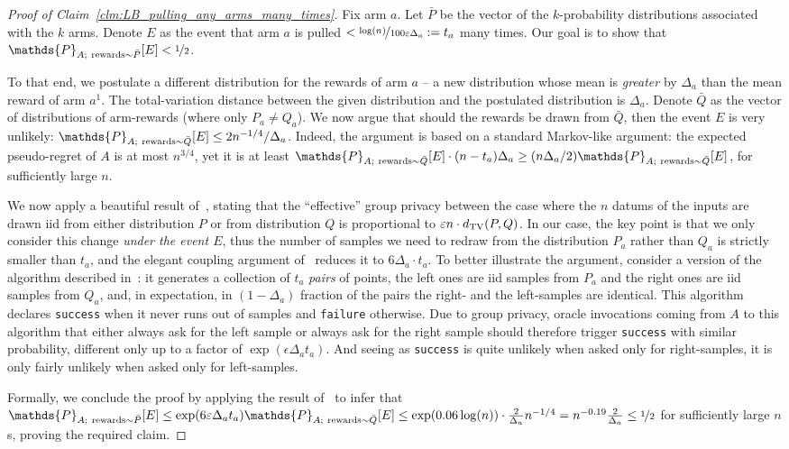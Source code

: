 \documentclass{article}
\renewcommand{\Pr}{\mathds{P}}
\begin{document}
\begin{proof}[Proof of Claim~\ref{clm:LB_pulling_any_arms_many_times}]
Fix arm $a$. Let $\bar P$ be the vector of the $k$-probability distributions associated with the $k$ arms. Denote $E$ as the event that arm $a$ is pulled $<\nicefrac{\log(n)}{100\varepsilon\Delta_a} := t_a$ many times. Our goal is to show that $\Pr_{A;~{\rm rewards}\sim \bar P}[E]<\nicefrac 1 2$.

To that end, we postulate a different distribution for the rewards of
arm $a$ -- a new distribution whose mean is \emph{greater} by
$\Delta_a$ than the mean reward of arm $a^1$. The total-variation
distance between the given distribution and the postulated
distribution is $\Delta_a$. Denote $\bar Q$ as the vector of
distributions of arm-rewards (where only $P_a \neq Q_a$). We now argue
that should the rewards be drawn from $\bar Q$, then the event $E$ is
very unlikely: $\Pr_{A;~{\rm rewards}\sim \bar Q}[E] \leq 2n^{-1/4}/\Delta_a$. Indeed, the argument is based on a standard Markov-like argument: the expected pseudo-regret of $A$ is at most $n^{3/4}$, yet it is at least $\Pr_{A;~{\rm rewards}\sim \bar Q}[E]\cdot (n-t_a) \Delta_a \geq  (n\Delta_a/2)\Pr_{A;~{\rm rewards}\sim \bar Q}[E]$, for sufficiently large $n$.


We now apply a beautiful result of~\citet[Lemma~6.1]{KarwaVadhanFiniteSampleDP2017}, stating that the ``effective'' group privacy between the case where the $n$ datums of the inputs are drawn iid from either distribution $P$ or from distribution $Q$ is proportional to $\varepsilon n\cdot d_{\rm TV}(P,Q)$. In our case, the key point is that we only consider this change \emph{under the event $E$}, thus the number of samples we need to redraw from the distribution $P_a$ rather than $Q_a$ is strictly smaller than $t_a$, and the elegant coupling argument of~\cite{KarwaVadhanFiniteSampleDP2017} reduces it to $6\Delta_a \cdot t_a$. To better illustrate the argument, consider a version of the algorithm described in~\cite{KarwaVadhanFiniteSampleDP2017}: it generates a collection of $t_a$ \emph{pairs} of points, the left ones are iid samples from $P_a$ and the right ones are iid samples from $Q_a$, and, in expectation, in $(1-\Delta_a)$ fraction of the pairs the right- and the left-samples are identical. This algorithm declares {\tt success} when it never runs out of samples and {\tt failure} otherwise. Due to group privacy, oracle invocations coming from $A$ to this algorithm that either always ask for the left sample or always ask for the right sample should therefore trigger {\tt success} with similar probability, different only up to a factor of $\exp(\epsilon \Delta_a t_a)$. And seeing as {\tt success} is quite unlikely when asked only for right-samples, it is only fairly unlikely when asked only for left-samples.

Formally, we conclude the proof by applying the result
of~\cite{KarwaVadhanFiniteSampleDP2017} to infer that $\Pr_{A;~{\rm
    rewards}\sim \bar P}[E] \leq \exp(6\varepsilon\Delta_a
t_a)\Pr_{A;~{\rm rewards}\sim \bar Q}[E] \leq \exp(0.06 \log(n)) \cdot
\tfrac 2{\Delta_a}n^{-1/4} = n^{-0.19}\tfrac 2{\Delta_a} \leq \nicefrac 1
2$ for sufficiently large $n$s, proving the required claim.
\end{proof}
\end{document}
